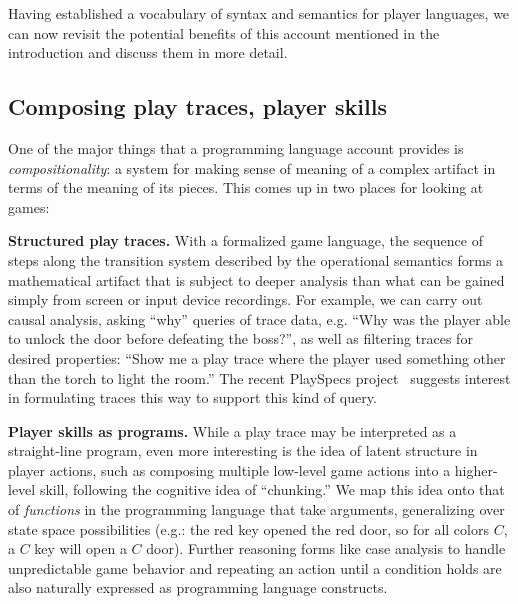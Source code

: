 
Having established a vocabulary of syntax and semantics for player
languages, we can now revisit the potential benefits of this account
mentioned in the introduction and discuss them in more detail.

\subsection{Composing play traces, player skills}

One of the major things that a programming language account provides is
{\em compositionality}: a system for making sense of meaning of a complex
artifact in terms of the meaning of its pieces. This comes up in two places
for looking at games:

{\bf Structured play traces.} With a formalized game language, the sequence
of steps along the transition system described by the operational semantics
forms a mathematical artifact that is subject to deeper analysis than what
can be gained simply from screen or input device recordings. For example,
we can carry out causal analysis, asking ``why'' queries of trace data,
e.g. ``Why was the player able to unlock the door before defeating the boss?'',
as well as filtering traces for desired properties: ``Show me a play trace
where the player used something other than the torch to light the room.''
The recent PlaySpecs project~\cite{osborn2015playspecs} suggests interest
in formulating traces this way to support this kind of query.

{\bf Player skills as programs.} While a play trace may be interpreted as a
straight-line program, even more interesting is the idea of latent
structure in player actions, such as composing multiple low-level game
actions into a higher-level skill, following the cognitive idea of
``chunking.'' We map this idea onto that of {\em functions} in the
programming language that take arguments, generalizing over state space
possibilities (e.g.: the red key opened the red door, so for all colors
$C$, a $C$ key will open a $C$ door). Further reasoning forms like case
analysis to handle unpredictable game behavior and repeating an action
until a condition holds are also naturally expressed as programming
language constructs.


